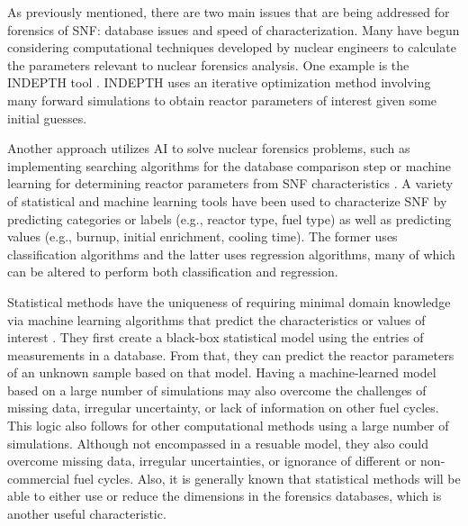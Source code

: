 As previously mentioned, there are two main issues that are being addressed for
forensics of \gls{SNF}: database issues and speed of characterization.  Many
have begun considering computational techniques developed by nuclear engineers
to calculate the parameters relevant to nuclear forensics analysis.  One
example is the \gls{INDEPTH} tool \cite{weber_2006, weber_2010, weber_2011}.
\gls{INDEPTH} uses an iterative optimization method involving many forward
simulations to obtain reactor parameters of interest given some initial
guesses. 

Another approach utilizes \gls{AI} to solve nuclear forensics problems, such as
implementing searching algorithms for the database comparison step
\cite{gey_search} or machine learning for determining reactor parameters from
\gls{SNF} characteristics \cite{dayman_feasibility_2013, nicolaou_2006,
nicolaou_2009, nicolaou_2014, robel_2009, pu_discrimination, jones_viz_2014,
jones_snf_2014}.  A variety of statistical and machine learning tools have been
used to characterize \gls{SNF} by predicting categories or labels (e.g.,
reactor type, fuel type) as well as predicting values (e.g., burnup, initial
enrichment, cooling time). The former uses classification algorithms and the
latter uses regression algorithms, many of which can be altered to perform both
classification and regression.  

Statistical methods have the uniqueness of requiring minimal domain knowledge
via machine learning algorithms that predict the characteristics or values of
interest \cite{dayman_feasibility_2013, pu_discrimination, robel_2009,
nicolaou_2006, nicolaou_2009, nicolaou_2014, jones_snf_2014, jones_viz_2014}.
They first create a black-box statistical model using the entries of measurements in a database. From that,
they can predict the reactor parameters of an unknown sample based on that model.
Having a machine-learned model based on a large number of simulations may also
overcome the challenges of missing data, irregular uncertainty, or lack of
information on other fuel cycles.  This logic also follows for other
computational methods using a large number of simulations.  Although not
encompassed in a resuable model, they also could overcome missing data,
irregular uncertainties, or ignorance of different or non-commercial fuel
cycles.  Also, it is generally known that statistical methods will be able to
either use or reduce the dimensions in the forensics databases, which is
another useful characteristic.
